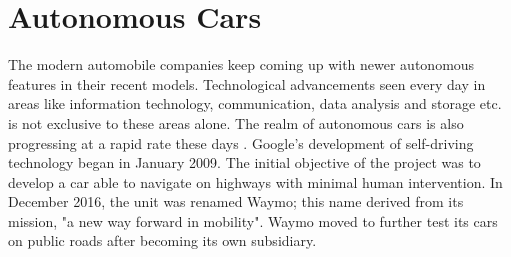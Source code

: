 \section{Autonomous Cars}
The modern automobile companies keep coming up with newer autonomous features in their recent models. Technological advancements seen every day in areas like information technology, communication, data analysis and storage etc. is not exclusive to these areas alone. The realm of autonomous cars is also progressing at a rapid rate these days \cite{Bimbraw2015}. Google's development of self-driving technology began in January 2009. The initial objective of the project was to develop a car able to navigate on highways with minimal human intervention. In December 2016, the unit was renamed Waymo; this name derived from its mission, "a new way forward in mobility". Waymo moved to further test its cars on public roads after becoming its own subsidiary.
